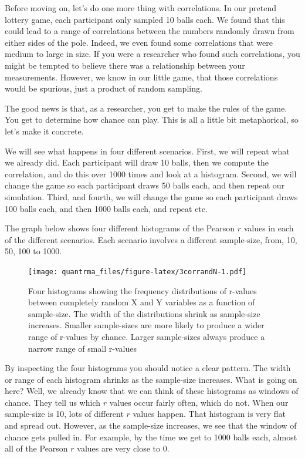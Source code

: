 \documentclass[
]{book}
\begin{document}
Before moving on, let's do one more thing with correlations. In our pretend lottery game, each participant only sampled 10 balls each. We found that this could lead to a range of correlations between the numbers randomly drawn from either sides of the pole. Indeed, we even found some correlations that were medium to large in size. If you were a researcher who found such correlations, you might be tempted to believe there was a relationship between your measurements. However, we know in our little game, that those correlations would be spurious, just a product of random sampling.

The good news is that, as a researcher, you get to make the rules of the game. You get to determine how chance can play. This is all a little bit metaphorical, so let's make it concrete.

We will see what happens in four different scenarios. First, we will repeat what we already did. Each participant will draw 10 balls, then we compute the correlation, and do this over 1000 times and look at a histogram. Second, we will change the game so each participant draws 50 balls each, and then repeat our simulation. Third, and fourth, we will change the game so each participant draws 100 balls each, and then 1000 balls each, and repeat etc.

The graph below shows four different histograms of the Pearson \(r\) values in each of the different scenarios. Each scenario involves a different sample-size, from, 10, 50, 100 to 1000.

\begin{figure}
\centering
\texttt{[image: quantrma\_files/figure-latex/3corrandN-1.pdf]}
\caption{\label{fig:3corrandN}Four histograms showing the frequency distributions of r-values between completely random X and Y variables as a function of sample-size. The width of the distributions shrink as sample-size increases. Smaller sample-sizes are more likely to produce a wider range of r-values by chance. Larger sample-sizes always produce a narrow range of small r-values}
\end{figure}

By inspecting the four histograms you should notice a clear pattern. The width or range of each histogram shrinks as the sample-size increases. What is going on here? Well, we already know that we can think of these histograms as windows of chance. They tell us which \(r\) values occur fairly often, which do not. When our sample-size is 10, lots of different \(r\) values happen. That histogram is very flat and spread out. However, as the sample-size increases, we see that the window of chance gets pulled in. For example, by the time we get to 1000 balls each, almost all of the Pearson \(r\) values are very close to 0.
\end{document}
